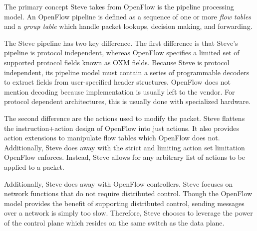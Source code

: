 The primary concept Steve takes from OpenFlow is the pipeline processing model.
An OpenFlow pipeline is defined as a sequence
of one or more \textit{flow tables} and a \textit{group table} which handle
packet lookups, decision making, and forwarding.

The Steve pipeline has two key difference.
The first difference is that
Steve's pipeline is protocol independent, whereas OpenFlow specifies a limited set of
supported protocol fields known as OXM fields.
Because Steve is protocol independent, its
pipeline model must contain a series of programmable decoders to extract fields
from user-specified header structures. 
OpenFlow does not mention decoding because
implementation is usually left to the vendor.
For protocol dependent architectures, this is
usually done with specialized hardware.

The second difference are the actions used to modify the packet.
Steve flattens the instruction+action design of OpenFlow into
just actions. It also provides action extensions to manipulate flow tables
which OpenFlow does not. Additionally, Steve does away with the
strict and limiting action set limitation OpenFlow enforces.
Instead, Steve allows for any arbitrary list of actions to be applied
to a packet. 

Additionally, Steve does away with OpenFlow controllers. 
Steve focuses on network functions that do not require distributed control.
Though the OpenFlow model provides
the benefit of supporting distributed control, sending messages
over a network is simply too slow.
Therefore, Steve chooses to leverage the power of the control plane which
resides on the same switch as the data plane.


